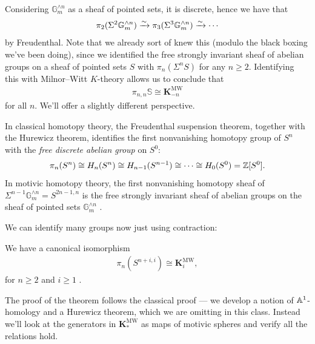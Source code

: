 \documentclass[11pt,openany]{book}
\let\smashprod\wedge
\providecommand{\KMW}{\mathbf{K}^\mathrm{MW}}
\begin{document}
Considering $\mathbb{G}_m^{\smashprod n}$ as a sheaf of pointed sets, it is discrete, hence we have that
\begin{align*}
    \pi_2(\Sigma^2 \mathbb{G}_m^{\smashprod n}) \xto{\sim} \pi_3(\Sigma^3 \mathbb{G}_m^{\smashprod n}) \xto{\sim} \cdots 
\end{align*}
by Freudenthal. Note that we already sort of knew this (modulo the black boxing we've been doing), since we identified the free strongly invariant sheaf of abelian groups on a sheaf of pointed sets $S$ with $\pi_n(\Sigma^n S)$ for any $n \ge 2$. Identifying this with Milnor--Witt $K$-theory allows us to conclude that
\begin{align*}
    \pi_{n,n}\mathbb{S}\cong \KMW_{-n}
\end{align*}
for all $n$. We'll offer a slightly different perspective.

\begin{intuition} In classical homotopy theory, the Freudenthal suspension theorem, together with the Hurewicz theorem, identifies the first nonvanishing homotopy group of $S^n$ with the \textit{free discrete abelian group} on $S^0$:
\begin{align*}
    \pi_n(S^n) \cong H_n(S^n) \cong H_{n-1}(S^{n-1}) \cong \cdots \cong H_0(S^0) = \mathbb{Z}[S^0].
\end{align*}
In motivic homotopy theory, the first nonvanishing homotopy sheaf of $\Sigma^{n-1} \mathbb{G}_m^{\smashprod n} = S^{2n-1,n}$ is the free strongly invariant sheaf of abelian groups on the sheaf of pointed sets $\mathbb{G}_m^{\smashprod n}$ \cite[1.23]{Morel}.
\end{intuition}

We can identify many groups now just using contraction:

\begin{corollary} We have a canonical isomorphism
\label{cor:pi_n_Sph_KMW}
\begin{align*}
    \pi_n \left( S^{n+i,i} \right) \cong \KMW_i,
\end{align*}
for $n\ge 2$ and $i\ge 1$ \cite[p.~167]{Morel}.
\end{corollary}

The proof of the theorem follows the classical proof --- we develop a notion of $\mathbb{A}^1$-homology and a Hurewicz theorem, which we are omitting in this class. Instead we'll look at the generators in $\KMW_\ast$ as maps of motivic spheres and verify all the relations hold.
\end{document}
